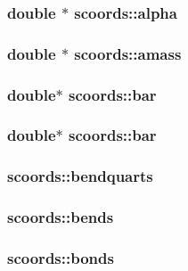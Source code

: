 \subsubsection{\setlength{\rightskip}{0pt plus 5cm}double $\ast$ {\bf scoords::alpha}}\label{structscoords_98507039843cc8a9e49cdaeca90b86a8}


\subsubsection{\setlength{\rightskip}{0pt plus 5cm}double $\ast$ {\bf scoords::amass}}\label{structscoords_c231be0d1e53f28d363d607c0ca8c0d9}


\subsubsection{\setlength{\rightskip}{0pt plus 5cm}double$\ast$ {\bf scoords::bar}}\label{structscoords_f3d4e6e0bc11c54f2bcd09af05470e1a}


\subsubsection{\setlength{\rightskip}{0pt plus 5cm}double$\ast$ {\bf scoords::bar}}\label{structscoords_f3d4e6e0bc11c54f2bcd09af05470e1a}


\subsubsection{ {\bf scoords::bendquarts}}\label{structscoords_ec380ede10314b27d995ca569cefdd51}


\subsubsection{ {\bf scoords::bends}}\label{structscoords_34c9d6e924644b45a4f85b6a27781c48}


\subsubsection{ {\bf scoords::bonds}}\label{structscoords_7796db2db04f71a0bb9c7c43ce4a7e73}


